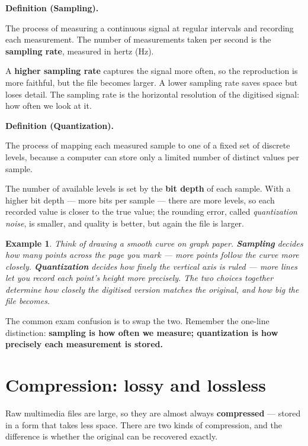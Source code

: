 \documentclass[11pt]{article}
\newtheorem{example}{Example}[section]
\newenvironment{definitionbox}[1]{%
  \par\noindent\textbf{Definition (#1).}\ \itshape
}{\par\vspace{0.3em}}
\begin{document}
\begin{definitionbox}{Sampling}
The process of measuring a continuous signal at regular intervals and
recording each measurement. The number of measurements taken per second is
the \textbf{sampling rate}, measured in hertz (Hz).
\end{definitionbox}

A \textbf{higher sampling rate} captures the signal more often, so the
reproduction is more faithful, but the file becomes larger. A lower sampling
rate saves space but loses detail. The sampling rate is the horizontal
resolution of the digitised signal: how often we look at it.

\begin{definitionbox}{Quantization}
The process of mapping each measured sample to one of a fixed set of discrete
levels, because a computer can store only a limited number of distinct values
per sample.
\end{definitionbox}

The number of available levels is set by the \textbf{bit depth} of each
sample. With a higher bit depth --- more bits per sample --- there are more
levels, so each recorded value is closer to the true value; the rounding
error, called \emph{quantization noise}, is smaller, and quality is better,
but again the file is larger.

\begin{example}
Think of drawing a smooth curve on graph paper. \textbf{Sampling} decides how
many points across the page you mark --- more points follow the curve more
closely. \textbf{Quantization} decides how finely the vertical axis is ruled
--- more lines let you record each point's height more precisely. The two
choices together determine how closely the digitised version matches the
original, and how big the file becomes.
\end{example}

The common exam confusion is to swap the two. Remember the one-line
distinction: \textbf{sampling is how often we measure; quantization is how
precisely each measurement is stored.}

\section{Compression: lossy and lossless}
Raw multimedia files are large, so they are almost always \textbf{compressed}
--- stored in a form that takes less space. There are two kinds of
compression, and the difference is whether the original can be recovered
exactly.
\end{document}
